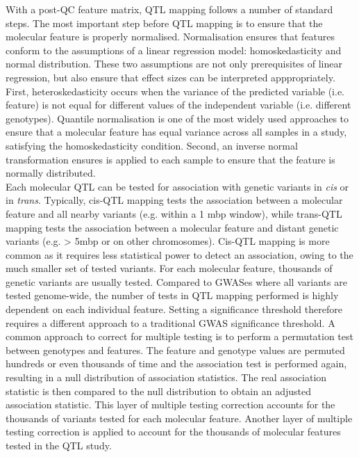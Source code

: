 With a post-QC feature matrix, QTL mapping follows a number of standard steps. The most important step before QTL mapping is to ensure that the molecular feature is properly normalised. Normalisation ensures that features conform to the assumptions of a linear regression model: homoskedasticity and normal distribution. These two assumptions are not only prerequisites of linear regression, but also ensure that effect sizes can be interpreted apppropriately. First, heteroskedasticity occurs when the variance of the predicted variable (i.e. feature) is not equal for different values of the independent variable (i.e. different genotypes). Quantile normalisation is one of the most widely used approaches to ensure that a molecular feature has equal variance across all samples in a study, satisfying the homoskedasticity condition. Second, an inverse normal transformation ensures is applied to each sample to ensure that the feature is normally distributed.\\ 

Each molecular QTL can be tested for association with genetic variants in \textit{cis} or in \textit{trans}. Typically, cis-QTL mapping tests the association between a molecular feature and all nearby variants (e.g. within a 1 mbp window), while trans-QTL mapping tests the association between a molecular feature and distant genetic variants (e.g. > 5mbp or on other chromosomes). Cis-QTL mapping is more common as it requires less statistical power to detect an association, owing to the much smaller set of tested variants. For each molecular feature, thousands of genetic variants are usually tested. Compared to GWASes where all variants are tested genome-wide, the number of tests in QTL mapping performed is highly dependent on each individual feature. Setting a significance threshold therefore requires a different approach to a traditional GWAS significance threshold. A common approach to correct for multiple testing is to perform a permutation test between genotypes and features. The feature and genotype values are permuted hundreds or even thousands of time and the association test is performed again, resulting in a null distribution of association statistics. The real association statistic is then compared to the null distribution to obtain an adjusted association statistic. This layer of multiple testing correction accounts for the thousands of variants tested for each molecular feature. Another layer of multiple testing correction is applied to account for the thousands of molecular features tested in the QTL study. \\

